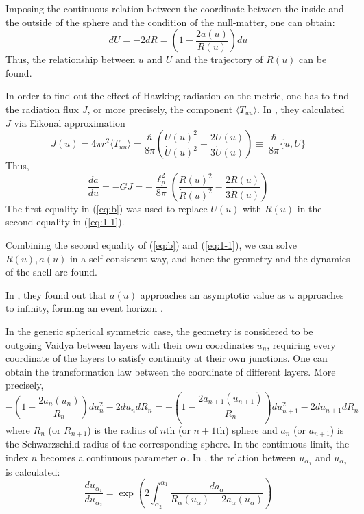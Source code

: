 \documentclass[letterpaper,12pt]{article}
\begin{document}
Imposing the continuous relation between the coordinate between the inside and the outside of the sphere and the condition of the null-matter, one can obtain:
\begin{equation}\label{eq:b}
dU = -2dR = \left(1-\frac{2a(u)}{R(u)}\right)du
\end{equation}
Thus, the relationship between $u$ and $U$ and the trajectory of $R(u)$ can be found.

In order to find out the effect of Hawking radiation on the metric, one has to find the radiation flux $J$, or more precisely, the component $\langle T_{uu} \rangle$. In \cite{kawai2013self}, they calculated $J$ via Eikonal approximation 
\begin{equation}\label{eq:c}
J(u) = 4\pi r^2 \langle T_{uu} \rangle = \frac{\hbar}{8\pi}\left(\frac{\ddot{U}(u)^{2}}{\dot{U}(u)^{2}}-\frac{2\dddot{U}(u)}{3\dot{U}(u)}\right)
\equiv\ \frac{\hbar}{8\pi} \{u, U \}
\end{equation}
Thus,
\begin{equation}\label{eq:1-1}
\frac{da}{du} = -GJ = -\frac{\ell_{p}^{2}}{8\pi}\left(\frac{\ddot{R}(u)^{2}}{\dot{R}(u)^{2}}-\frac{2\dddot{R}(u)}{3\dot{R}(u)}\right)
\end{equation}
The first equality in (\ref{eq:b}) was used to replace $U(u)$ with $R(u)$ in the second equality in (\ref{eq:1-1}).

Combining the second equality of (\ref{eq:b}) and (\ref{eq:1-1}), we can solve $R(u), a(u)$ in a self-consistent way, and hence the geometry and the dynamics of the shell are found.

In \cite{kawai2013self}, they found out that $a(u)$ approaches an asymptotic value as $u$ approaches to infinity, forming an event horizon \cite{ho2015comment,kawai2013self}.

In the generic spherical symmetric case, the geometry is considered to be outgoing Vaidya between layers with their own coordinates $u_{n}$, requiring every coordinate of the layers to satisfy continuity at their own junctions. One can obtain the transformation law between the coordinate of different layers. More precisely,
\begin{equation}
-\left(1-\frac{2a_{n}(u_{n})}{R_{n}}\right)du_{n}^2-2du_{n}dR_{n} = -\left(1-\frac{2a_{n+1}(u_{n+1})}{R_{n}}\right)du_{n+1}^2-2du_{n+1}dR_{n}
\end{equation}
where $R_{n}$ (or $R_{n+1}$) is the radius of $n$th (or $n+1$th) sphere and $a_{n}$ (or $a_{n+1}$) is the Schwarzschild radius of the corresponding sphere.
In the continuous limit, the index $n$ becomes a continuous parameter $\alpha$. In \cite{kawai2013self}, the relation between $u_{\alpha_{1}}$ and $u_{\alpha_{2}}$ is calculated:
\begin{equation}\label{eq:d}
\frac{du_{\alpha_{1}}}{du_{\alpha_{2}}}= \exp\left( 2 \int_{\alpha_{2}}^{\alpha_{1}}\frac{da_{\alpha}}{R_{\alpha}(u_{\alpha})-2a_{\alpha}(u_{\alpha})}\right)
\end{equation}
\end{document}
